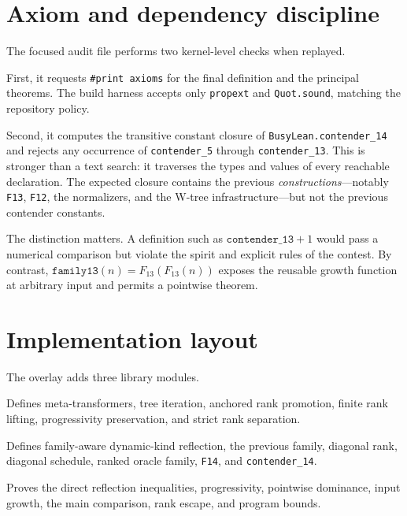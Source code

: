 \documentclass[11pt]{article}
\theoremstyle{definition}
\theoremstyle{remark}
\newcommand{\lean}[1]{\texttt{#1}}
\begin{document}
\section{Axiom and dependency discipline}

The focused audit file performs two kernel-level checks when replayed.

First, it requests \lean{\#print axioms} for the final definition and the
principal theorems.  The build harness accepts only \lean{propext} and
\lean{Quot.sound}, matching the repository policy.

Second, it computes the transitive constant closure of
\lean{BusyLean.contender\_14} and rejects any occurrence of
\lean{contender\_5} through \lean{contender\_13}.  This is stronger than a
text search: it traverses the types and values of every reachable declaration.
The expected closure contains the previous \emph{constructions}---notably
\lean{F13}, \lean{F12}, the normalizers, and the W-tree infrastructure---but
not the previous contender constants.

The distinction matters.  A definition such as
\(\lean{contender\_13}+1\) would pass a numerical comparison but violate the
spirit and explicit rules of the contest.  By contrast,
\(\lean{family13}(n)=F_{13}(F_{13}(n))\) exposes the reusable growth function
at arbitrary input and permits a pointwise theorem.

\section{Implementation layout}

The overlay adds three library modules.

\begin{description}[leftmargin=3.3cm,style=nextline]
\item[\lean{HyperReflection.lean}]
Defines meta-transformers, tree iteration, anchored rank promotion, finite
rank lifting, progressivity preservation, and strict rank separation.

\item[\lean{Contender14.lean}]
Defines family-aware dynamic-kind reflection, the previous family, diagonal
rank, diagonal schedule, ranked oracle family, \lean{F14}, and
\lean{contender\_14}.

\item[\lean{Comparison14.lean}]
Proves the direct reflection inequalities, progressivity, pointwise dominance,
input growth, the main comparison, rank escape, and program bounds.
\end{description}
\end{document}
